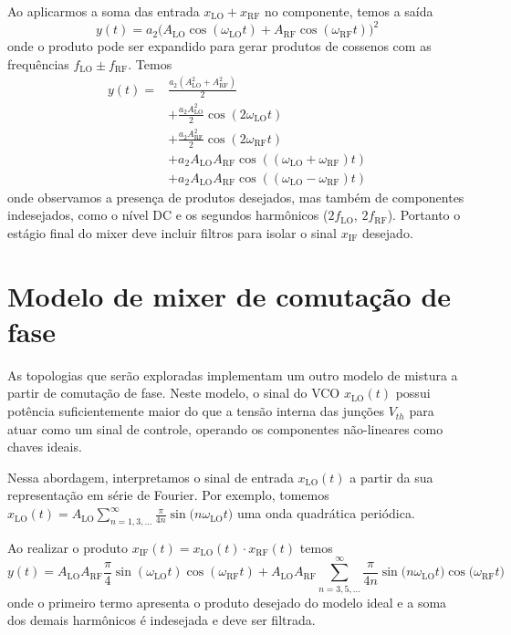 \documentclass[10pt]{article}
\begin{document}
Ao aplicarmos a soma das entrada $x_{\text{LO}} + x_{\text{RF}}$ no componente, temos a saída
\[
y(t) = a_2 \bigl( A_{\text{LO}}\cos(\omega_{\text{LO}}t) + A_{\text{RF}}\cos(\omega_{\text{RF}}t) \bigr)^2
\]
onde o produto pode ser expandido para gerar produtos de cossenos com as frequências $f_{\text{LO}} \pm f_{\text{RF}}$. Temos
\[
\begin{split}
y(t) = &\frac{a_2( A_{\text{LO}}^2 + A_{\text{RF}}^2)}{2} \\
& + \frac{a_2 A_{\text{LO}}^2}{2}\cos(2\omega_{\text{LO}}t) \\
& + \frac{a_2 A_{\text{RF}}^2}{2}\cos(2\omega_{\text{RF}}t) \\
& + a_2 A_{\text{LO}} A_{\text{RF}}\cos((\omega_{\text{LO}} + \omega_{\text{RF}})t) \\
& + a_2 A_{\text{LO}} A_{\text{RF}}\cos((\omega_{\text{LO}} - \omega_{\text{RF}})t)
\end{split}
\]
onde observamos a presença de produtos desejados, mas também de componentes indesejados, como o nível DC e os segundos harmônicos ($2f_{\text{LO}}$, $2f_{\text{RF}}$). Portanto o estágio final do mixer deve incluir filtros para isolar o sinal $x_{\text{IF}}$ desejado.

\section{Modelo de mixer de comutação de fase} \label{section:phaseSwitch}

As topologias que serão exploradas implementam um outro modelo de mistura a partir de comutação de fase. Neste modelo, o sinal do VCO $x_{\text{LO}}(t)$ possui potência suficientemente maior do que a tensão interna das junções $V_{th}$ para atuar como um sinal de controle, operando os componentes não-lineares como chaves ideais.

Nessa abordagem, interpretamos o sinal de entrada $x_{\text{LO}}(t)$ a partir da sua representação em série de Fourier. Por exemplo, tomemos $x_{\text{LO}}(t) = A_{\text{LO}}\sum_{n=1,3,\dots}^{\infty} \frac{\pi}{4n} \sin\bigl(n \omega_{\text{LO}} t\bigr)$ uma onda quadrática periódica.

Ao realizar o produto $x_{\text{IF}}(t) = x_{\text{LO}}(t) \cdot x_{\text{RF}}(t)$ temos
\[
y(t) = A_{\text{LO}}A_{\text{RF}}\frac{\pi}{4}\sin(\omega_{\text{LO}}t)\cos(\omega_{\text{RF}}t) + A_{\text{LO}}A_{\text{RF}}\sum_{n=3,5,\dots}^{\infty} \frac{\pi}{4n} \sin\bigl(n \omega_{\text{LO}} t\bigr)\cos\bigl(\omega_{\text{RF}} t\bigr)
\]
onde o primeiro termo apresenta o produto desejado do modelo ideal e a soma dos demais harmônicos é indesejada e deve ser filtrada.
\end{document}
